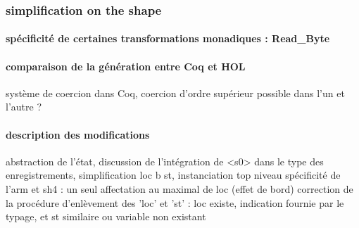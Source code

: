 \documentclass[a4paper, 11pt]{article}
\begin{document}
    \subsubsection{simplification on the shape}
      \paragraph{spécificité de certaines transformations monadiques : Read\_Byte}
      \paragraph{comparaison de la génération entre Coq et HOL}
      \cite{conf/itp/FoxM10}
      système de coercion dans Coq, coercion d'ordre supérieur possible dans l'un et l'autre ?
      \paragraph{description des modifications}
      abstraction de l'état, 
      discussion de l'intégration de <s0> dans le type des enregistrements,
      simplification {loc b st}, instanciation top niveau
      spécificité de l'arm et sh4 : un seul affectation au maximal de loc (effet de bord)
      correction de la procédure d'enlèvement des 'loc' et 'st' : loc existe, indication fournie par le typage, et st similaire ou variable non existant
\end{document}
